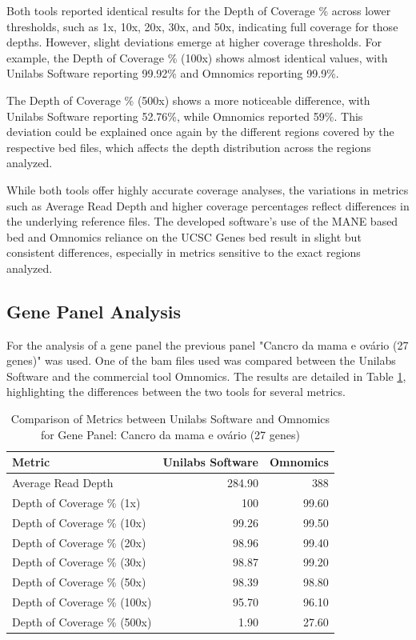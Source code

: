Both tools reported identical results for the Depth of Coverage \% across lower thresholds, such as 1x, 10x, 20x, 30x, and 50x, indicating full coverage for those depths. However, slight deviations emerge at higher coverage thresholds. For example, the Depth of Coverage \% (100x) shows almost identical values, with Unilabs Software reporting 99.92\% and Omnomics reporting 99.9\%.

The Depth of Coverage \% (500x) shows a more noticeable difference, with Unilabs Software reporting 52.76\%, while Omnomics reported 59\%. This deviation could be explained once again by the different regions covered by the respective \ac{bed} files, which affects the depth distribution across the regions analyzed.

While both tools offer highly accurate coverage analyses, the variations in metrics such as Average Read Depth and higher coverage percentages reflect differences in the underlying reference files. The developed software's use of the MANE based \ac{bed} and Omnomics reliance on the UCSC Genes \ac{bed} result in slight but consistent differences, especially in metrics sensitive to the exact regions analyzed.

\subsection{Gene Panel Analysis}

For the analysis of a gene panel the previous panel "Cancro da mama e ovário (27 genes)" was used. One of the \ac{bam} files used was compared between the Unilabs Software and the commercial tool Omnomics. The results are detailed in Table \ref{tab:panel_omnomicsVSunilabs}, highlighting the differences between the two tools for several metrics.

\begin{table}[]
\centering
\caption{Comparison of Metrics between Unilabs Software and Omnomics for Gene Panel: Cancro da mama e ovário (27 genes)}
\label{tab:panel_omnomicsVSunilabs}
\begin{tabular}{lrr}
\textbf{Metric}                      & \textbf{Unilabs Software} & \textbf{Omnomics} \\ \hline
Average Read Depth          & 284.90           & 388      \\
Depth of Coverage \% (1x)   & 100              & 99.60     \\
Depth of Coverage \% (10x)  & 99.26            & 99.50     \\
Depth of Coverage \% (20x)  & 98.96            & 99.40     \\
Depth of Coverage \% (30x)  & 98.87            & 99.20     \\
Depth of Coverage \% (50x)  & 98.39            & 98.80     \\
Depth of Coverage \% (100x) & 95.70            & 96.10     \\
Depth of Coverage \% (500x) & 1.90             & 27.60    
\end{tabular}
\end{table}

